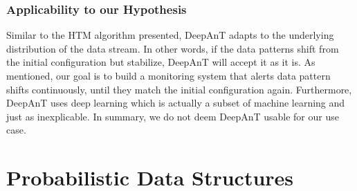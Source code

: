 \subsubsection*{Applicability to our Hypothesis}

Similar to the HTM algorithm presented, DeepAnT adapts to the underlying distribution of the data stream. In other words, if the data patterns shift from the initial configuration but stabilize, DeepAnT will accept it as it is. As mentioned, our goal is to build a monitoring system that alerts data pattern shifts continuously, until they match the initial configuration again. Furthermore, DeepAnT uses deep learning which is actually a subset of machine learning and just as inexplicable. In summary, we do not deem DeepAnT usable for our use case.




\section{Probabilistic Data Structures} \label{sec:pds}

